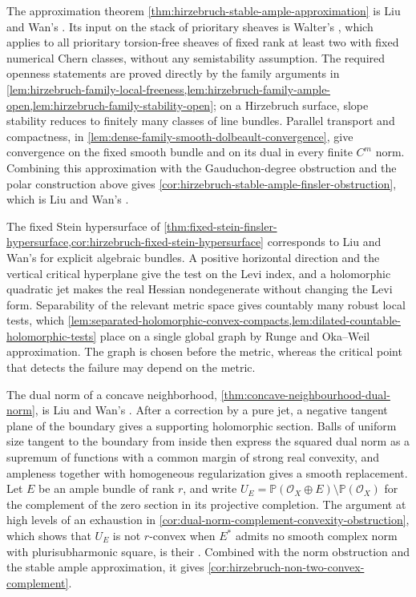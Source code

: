 The approximation theorem \cref{thm:hirzebruch-stable-ample-approximation} is Liu and Wan's \cite[v1, Theorem~4.1, p.~17; proof, p.~22]{LiuWanKobayashi26}. Its input on the stack of prioritary sheaves is Walter's \cite[Proposition~2]{WalterPrioritary93}, which applies to all prioritary torsion-free sheaves of fixed rank at least two with fixed numerical Chern classes, without any semistability assumption. The required openness statements are proved directly by the family arguments in \cref{lem:hirzebruch-family-local-freeness,lem:hirzebruch-family-ample-open,lem:hirzebruch-family-stability-open}; on a Hirzebruch surface, slope stability reduces to finitely many classes of line bundles. Parallel transport and compactness, in \cref{lem:dense-family-smooth-dolbeault-convergence}, give convergence on the fixed smooth bundle and on its dual in every finite $C^m$ norm. Combining this approximation with the Gauduchon-degree obstruction and the polar construction above gives \cref{cor:hirzebruch-stable-ample-finsler-obstruction}, which is Liu and Wan's \cite[v1, Theorem~1.1, p.~2; proof, p.~23]{LiuWanKobayashi26}.

The fixed Stein hypersurface of \cref{thm:fixed-stein-finsler-hypersurface,cor:hirzebruch-fixed-stein-hypersurface} corresponds to Liu and Wan's \cite[v1, Proposition~5.1, pp.~24--27]{LiuWanKobayashi26} for explicit algebraic bundles. A positive horizontal direction and the vertical critical hyperplane give the test on the Levi index, and a holomorphic quadratic jet makes the real Hessian nondegenerate without changing the Levi form. Separability of the relevant metric space gives countably many robust local tests, which \cref{lem:separated-holomorphic-convex-compacts,lem:dilated-countable-holomorphic-tests} place on a single global graph by Runge and Oka--Weil approximation. The graph is chosen before the metric, whereas the critical point that detects the failure may depend on the metric.

The dual norm of a concave neighborhood, \cref{thm:concave-neighbourhood-dual-norm}, is Liu and Wan's \cite[v1, Lemma~5.2, pp.~27--32]{LiuWanKobayashi26}. After a correction by a pure jet, a negative tangent plane of the boundary gives a supporting holomorphic section. Balls of uniform size tangent to the boundary from inside then express the squared dual norm as a supremum of functions with a common margin of strong real convexity, and ampleness together with homogeneous regularization gives a smooth replacement. Let $E$ be an ample bundle of rank $r$, and write $U_E=\mathbb P(\mathcal O_X\oplus E)\setminus\mathbb P(\mathcal O_X)$ for the complement of the zero section in its projective completion. The argument at high levels of an exhaustion in \cref{cor:dual-norm-complement-convexity-obstruction}, which shows that $U_E$ is not $r$-convex when $E^*$ admits no smooth complex norm with plurisubharmonic square, is their \cite[v1, Corollary~5.3, p.~32]{LiuWanKobayashi26}. Combined with the norm obstruction and the stable ample approximation, it gives \cref{cor:hirzebruch-non-two-convex-complement}.

